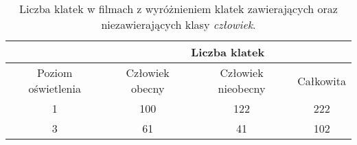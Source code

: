 \begin{table}[H]
    \centering
    \caption{Liczba klatek w filmach z wyróżnieniem klatek zawierających oraz niezawierających klasy \emph{człowiek}.}
    \begin{tabular}{c|ccc|}
    \cline{2-4}
                                             & \multicolumn{3}{c|}{Liczba klatek}                                                         \\ \hline
    \multicolumn{1}{|c|}{Poziom oświetlenia} & \multicolumn{1}{c|}{Człowiek obecny} & \multicolumn{1}{c|}{Człowiek nieobecny} & Całkowita \\ \hline
    \multicolumn{1}{|c|}{1}                  & \multicolumn{1}{c|}{100}             & \multicolumn{1}{c|}{122}                & 222       \\ \hline
    \multicolumn{1}{|c|}{3}                  & \multicolumn{1}{c|}{61}              & \multicolumn{1}{c|}{41}                 & 102       \\ \hline
    \end{tabular}
    \label{tab:liczba-klatek}
    \end{table}